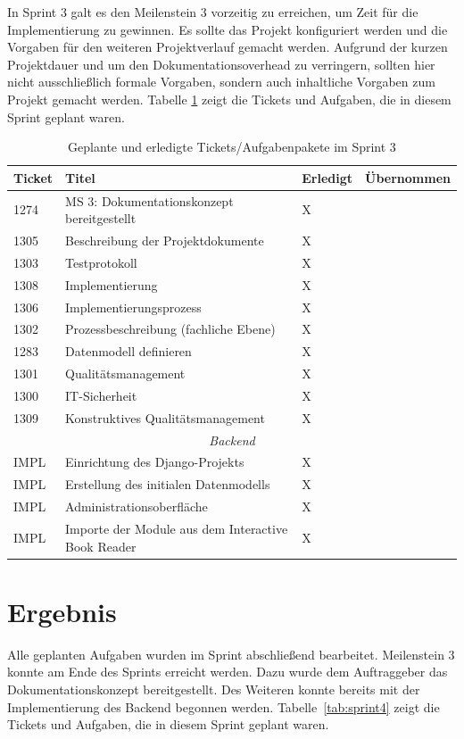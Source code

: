 \documentclass[a4paper,11pt,listof=numbered,glossary=totoc,parskip=half,toc=bib]{scrreprt}
\begin{document}
In Sprint 3 galt es den Meilenstein 3 vorzeitig zu erreichen, um Zeit für die Implementierung zu gewinnen. Es sollte das Projekt konfiguriert werden und die Vorgaben für den weiteren Projektverlauf gemacht werden. Aufgrund der kurzen Projektdauer und um den Dokumentationsoverhead zu verringern, sollten hier nicht ausschließlich formale Vorgaben, sondern auch inhaltliche Vorgaben zum Projekt gemacht werden. Tabelle \ref{tab:sprint3} zeigt die Tickets und Aufgaben, die in diesem Sprint geplant waren.

\begin{table}    
    \begin{tabularx}{\textwidth}{lXll}
			\toprule
			\textbf{Ticket} & \textbf{Titel} & \textbf{Erledigt} & \textbf{Übernommen} \\
			\midrule
1274	&	MS 3: Dokumentationskonzept bereitgestellt	&	X	&		\\
1305	&	Beschreibung der Projektdokumente	&	X	&		\\
1303	&	Testprotokoll	&	X	&		\\
1308	&	Implementierung	&	X	&		\\
1306	&	Implementierungsprozess	&	X	&		\\
1302	&	Prozessbeschreibung (fachliche Ebene)	&	X	&		\\
1283	&	Datenmodell definieren	&	X	&		\\
1301	&	Qualitätsmanagement	&	X	&		\\
1300	&	IT-Sicherheit	&	X	&		\\
1309	&	Konstruktives Qualitätsmanagement	&	X	&		\\
		\midrule
		\multicolumn{4}{c}{\textit{Backend}}\\
		\midrule
IMPL	&	Einrichtung des Django-Projekts	&	X	&		\\
IMPL	&	Erstellung des initialen Datenmodells	&	X	&		\\
IMPL	&	Administrationsoberfläche	&	X	&		\\
IMPL	&	Importe der Module aus dem Interactive Book Reader	&	X	&		\\

			\bottomrule
		\end{tabularx}
\caption{Geplante und erledigte Tickets/Aufgabenpakete im Sprint 3}
\label{tab:sprint3}
\end{table}
    
    \section{Ergebnis}
    Alle geplanten Aufgaben wurden im Sprint abschließend bearbeitet. Meilenstein 3 konnte am Ende des Sprints erreicht werden. Dazu wurde dem Auftraggeber das Dokumentationskonzept bereitgestellt. Des Weiteren konnte bereits mit der Implementierung des Backend begonnen werden. Tabelle~\ref{tab:sprint4} zeigt die Tickets und Aufgaben, die in diesem Sprint geplant waren.
    
\end{document}
